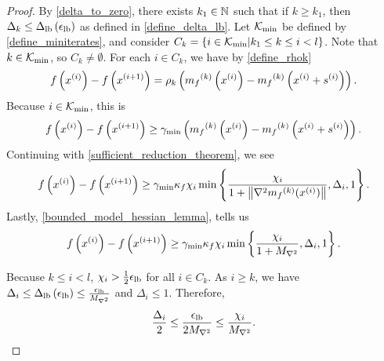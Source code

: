 \begin{proof}

By \cref{delta_to_zero}, there exists $k_1 \in \mathbb N$ such that if $k \ge k_1$, 
then $\Delta_k \le{\Delta_{\textrm{lb}}\left(\epsilon_{\textrm{lb}}\right)}$ as defined in \cref{define_delta_lb}.
Let ${\mathcal K_{\textrm{min}}}$ be defined by \cref{define_miniterates}, and consider
$C_k = \left\{i \in {\mathcal K_{\textrm{min}}} | k_1 \le k \le i < l \right\}$.
Note that $k \in {\mathcal K_{\textrm{min}}}$, so $C_k \ne \emptyset $.
For each $i \in C_k$, we have by \cref{define_rhok}
\begin{align*}
f\left(x^{(i)}\right) - f\left(x^{(i+1)}\right) 
= \rho_k \left( {{m}_f}^{(k)}\left(x^{(i)}\right) - {{m}_f}^{(k)}\left(x^{(i)} + s^{(i)}\right) \right).
\end{align*}
Because $i \in {\mathcal K_{\textrm{min}}}$, this is
\begin{align*}
f\left(x^{(i)}\right) - f\left(x^{(i+1)}\right) \ge \gamma_{\textrm{min}} \left( {{m}_f}^{(k)}\left(x^{(i)}\right) - {{m}_f}^{(k)}\left(x^{(i)} + s^{(i)}\right) \right).
\end{align*}
Continuing with \cref{sufficient_reduction_theorem}, we see
\begin{align*}
f\left(x^{(i)}\right) - f\left(x^{(i+1)}\right)\ge \gamma_{\textrm{min}} \kappa_f \chi_i \min\left\{\frac{\chi_i}{1+\left\|\nabla^2 {{m}_f}^{(k)}(x^{(i)})\right\|}, \Delta_i, 1\right\} .
\end{align*}
Lastly, \cref{bounded_model_hessian_lemma}, tells us
\begin{align*}
f\left(x^{(i)}\right) - f\left(x^{(i+1)}\right)\ge \gamma_{\textrm{min}} \kappa_f \chi_i \min\left\{\frac{\chi_{i}}{1 + {M_{\nabla^2}}}, \Delta_i, 1\right\}.
\end{align*}

Because $ k \le i < l$, $\chi_i > \frac 1 2 {\epsilon_{\textrm{lb}}}$ for all $i \in C_k$.
As $i \ge k$, we have $\Delta_i \le {\Delta_{\textrm{lb}}\left(\epsilon_{\textrm{lb}}\right)} \le \frac{{\epsilon_{\textrm{lb}}}}{{M_{\nabla^2}}}$ and $\Delta_i \le 1$.
Therefore,
\begin{align*}
\frac{\Delta_i}{2} \le \frac{{\epsilon_{\textrm{lb}}}}{2 {M_{\nabla^2}}} \le \frac{\chi_i}{{M_{\nabla^2}}}.
\end{align*}


\end{proof}
